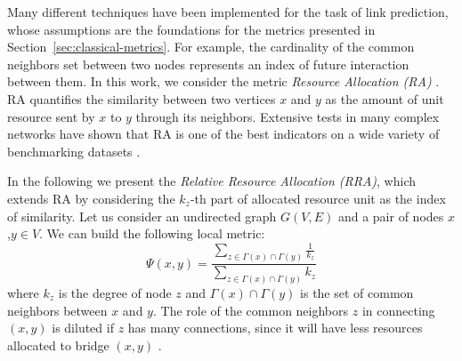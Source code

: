 
Many different techniques have been implemented for the task of link prediction, whose assumptions are the foundations for the metrics presented in Section~\ref{sec:classical-metrics}.
%
For example, the cardinality of the common neighbors set between two nodes represents an index of future interaction between them.
%
%
In this work, we consider the metric \textit{Resource Allocation (RA)} \cite{zhou2009predicting}. 
%
RA quantifies the similarity between two vertices $x$ and $y$ as the amount of unit resource sent by $x$ to $y$ through its neighbors.
%
Extensive tests in many complex networks have shown that RA is one of the best indicators on a wide variety of benchmarking datasets \cite{berlusconi2016link, Lu2011}.

In the following we present the \textit{Relative Resource Allocation (RRA)}, which extends RA by considering the $k_{z}$-th part of allocated resource unit as the index of similarity.
%
Let us consider an undirected graph $G(V,E)$ and a pair of nodes $x$,$y\in V$. We can build the following local metric:
%
\begin{equation}
\label{eqn:rra-local}
\Psi(x,y)=
\frac{\sum\limits_{z\in \Gamma(x) \cap \Gamma(y)}\frac{1}{k_{z}}}
{\sum\limits_{z\in \Gamma(x) \cap \Gamma(y)}k_{z}}
\end{equation}
%
where $k_{z}$ is the degree of node $z$ and $\Gamma(x) \cap \Gamma(y)$ is the set of common neighbors between $x$ and $y$. 
%
The role of the common neighbors $z$ in connecting $(x, y)$ is diluted if $z$ has many connections, since it will have less resources allocated to bridge $(x, y)$ \cite{berlusconi2016link}.





